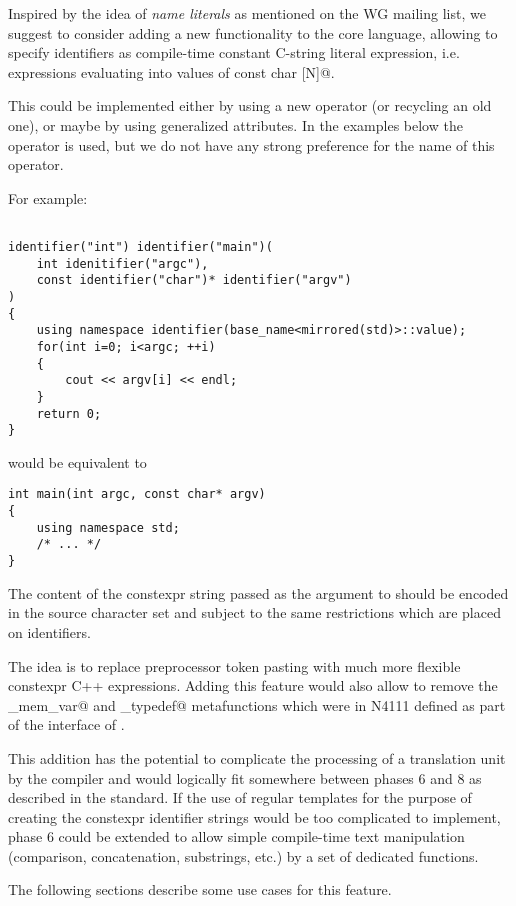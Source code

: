 Inspired by the idea of {\em name literals} as mentioned on the WG mailing list,
we suggest to consider adding a new functionality to the core language, allowing to specify
identifiers as compile-time constant C-string literal expression, i.e. expressions
evaluating into values of \verb@constexpr const char [N]@.

This could be implemented either by using a new operator (or recycling an old one),
or maybe by using generalized attributes.
In the examples below the \verb@identifier@ operator is used, but we do not have
any strong preference for the name of this operator.

For example:

\begin{verbatim}

identifier("int") identifier("main")(
	int idenitifier("argc"),
	const identifier("char")* identifier("argv")
)
{
	using namespace identifier(base_name<mirrored(std)>::value);
	for(int i=0; i<argc; ++i)
	{
		cout << argv[i] << endl;
	}
	return 0;
}

\end{verbatim}

would be equivalent to

\begin{verbatim}
int main(int argc, const char* argv)
{
	using namespace std;
	/* ... */
}
\end{verbatim}

The content of the constexpr string passed as the argument to \verb@identifier@
should be encoded in the source character set and subject to the same restrictions
which are placed on identifiers.

The idea is to replace preprocessor token pasting with much more flexible constexpr C++ expressions.
Adding this feature would also allow to remove the \verb@named_mem_var@ and
\verb@named_typedef@ metafunctions which were in N4111 defined as part of
the interface of .

This addition has the potential to complicate the processing of a translation unit
by the compiler and would logically fit somewhere between phases 6 and 8 as described
in the standard. If the use of regular templates for the purpose of creating the
constexpr identifier strings would be too complicated to implement, phase 6 could
be extended to allow simple compile-time text manipulation (comparison, concatenation,
substrings, etc.) by a set of dedicated functions.

The following sections describe some use cases for this feature.

